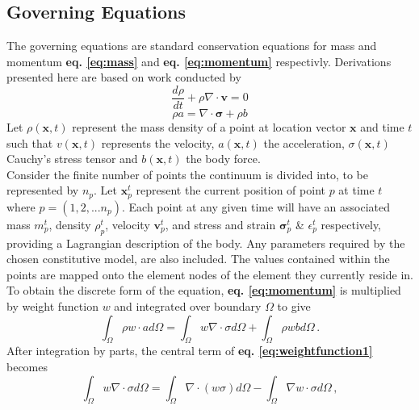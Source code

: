 \subsection{Governing Equations}
The governing equations are standard conservation equations for mass and momentum {\bfseries eq. \ref{eq:mass}} and  {\bfseries eq. \ref{eq:momentum}} respectivly. Derivations presented here are based on work conducted by \citet{sulsky95,Samila,Krishna,zhang16,Chen2002}
\begin{equation}
\frac{d\rho}{dt} + \rho\nabla\cdot \mathbf{v} = 0
\label{eq:mass}
\end{equation}
\begin{equation}
\rho a = \nabla\cdot\mathbf{\sigma} + \rho b
\label{eq:momentum}
\end{equation}
Let $\rho(\mathbf{x},t)$ represent the mass density of a point at location vector $\mathbf{x}$ and time $t$ such that $v(\mathbf{x},t)$ represents the velocity, $a(\mathbf{x},t)$ the acceleration, $\sigma(\mathbf{x},t)$ Cauchy's stress tensor and $b(\mathbf{x},t)$ the body force.\\
\newline
\noindent
Consider the finite number of points the continuum is divided into, to be represented by $n_p$. Let $\mathbf{x}_p^t$ represent the current position of point $p$ at time $t$ where $p=(1,2,...n_p)$. Each point at any given time will have an associated mass $m_p^t$, density $\rho_p^t$, velocity $\mathbf{v}_p^t$, and stress and strain $\mathbf{\sigma}_p^t$ \& $\epsilon_p^t$ respectively, providing a Lagrangian description of the body. Any parameters required by the chosen constitutive model, are also included. The values contained within the points are mapped onto the element nodes of the element they currently reside in.\\
\newline
\noindent
To obtain the discrete form of the equation, {\bfseries eq. \ref{eq:momentum}} is multiplied by weight function $w$ and integrated over boundary $\Omega$ to give
\begin{equation}
\int_\Omega \rho w \cdot ad\Omega = \int_\Omega w\nabla\cdot\sigma d\Omega + \int_\Omega \rho w b d\Omega \,.
\label{eq:weightfunction1}
\end{equation}
After integration by parts, the central term of {\bfseries eq. \ref{eq:weightfunction1}} becomes
\begin{equation}
\int_\Omega w\nabla\cdot\sigma d\Omega= \int_\Omega\nabla\cdot (w\sigma) d\Omega- \int_\Omega \nabla w\cdot\sigma d\Omega \,,
\label{eq:integrationbyparts2}
\end{equation}
